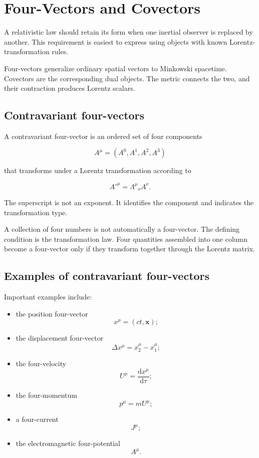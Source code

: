 \section{Four-Vectors and Covectors}
\label{sec:four_vectors_and_covectors}

A relativistic law should retain its form when one inertial observer is replaced by another. This requirement is easiest to express using objects with known Lorentz-transformation rules.

Four-vectors generalize ordinary spatial vectors to Minkowski spacetime. Covectors are the corresponding dual objects. The metric connects the two, and their contraction produces Lorentz scalars.

\subsection{Contravariant four-vectors}

A contravariant four-vector is an ordered set of four components

\[
A^{\mu}
=
(A^{0},A^{1},A^{2},A^{3})
\]

that transforms under a Lorentz transformation according to

\[
\boxed{
A'^{\mu}
=
\Lambda^{\mu}{}_{\nu}A^{\nu}
}.
\]

The superscript is not an exponent. It identifies the component and indicates the transformation type.

A collection of four numbers is not automatically a four-vector. The defining condition is the transformation law. Four quantities assembled into one column become a four-vector only if they transform together through the Lorentz matrix.

\subsection{Examples of contravariant four-vectors}

Important examples include:

\begin{itemize}
    \item the position four-vector
    \[
    x^{\mu}=(ct,\mathbf{x});
    \]

    \item the displacement four-vector
    \[
    \Delta x^{\mu}=x_{2}^{\mu}-x_{1}^{\mu};
    \]

    \item the four-velocity
    \[
    U^{\mu}=\frac{\mathrm{d}x^{\mu}}{\mathrm{d}\tau};
    \]

    \item the four-momentum
    \[
    p^{\mu}=mU^{\mu};
    \]

    \item a four-current
    \[
    J^{\mu};
    \]

    \item the electromagnetic four-potential
    \[
    A^{\mu}.
    \]
\end{itemize}

